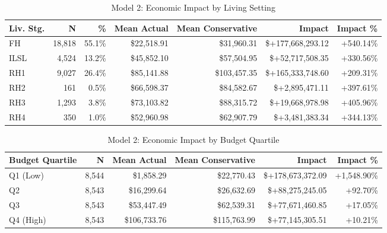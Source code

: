 \begin{table}[htbp]
\centering
\small
\caption{Model 2: Economic Impact by Living Setting}
\label{tab:model2_impact_living}
\begin{tabular}{lrrrrrr}
\toprule
\textbf{Liv. Stg.} & \textbf{N} & \textbf{\%} & \textbf{Mean Actual} & \textbf{Mean Conservative} & \textbf{Impact} & \textbf{Impact \%} \\
\midrule
FH & 18,818 & 55.1\% & \$22,518.91 & \$31,960.31 & \$+177,668,293.12 & +540.14\% \\
ILSL & 4,524 & 13.2\% & \$45,852.10 & \$57,504.95 & \$+52,717,508.35 & +330.56\% \\
RH1 & 9,027 & 26.4\% & \$85,141.88 & \$103,457.35 & \$+165,333,748.60 & +209.31\% \\
RH2 & 161 & 0.5\% & \$66,598.37 & \$84,582.67 & \$+2,895,471.11 & +397.61\% \\
RH3 & 1,293 & 3.8\% & \$73,103.82 & \$88,315.72 & \$+19,668,978.98 & +405.96\% \\
RH4 & 350 & 1.0\% & \$52,960.98 & \$62,907.79 & \$+3,481,383.34 & +344.13\% \\
\bottomrule
\end{tabular}
\end{table}

\begin{table}[htbp]
\centering
\small
\caption{Model 2: Economic Impact by Budget Quartile}
\label{tab:model2_impact_quartile}
\begin{tabular}{lrrrrr}
\toprule
\textbf{Budget Quartile} & \textbf{N} & \textbf{Mean Actual} & \textbf{Mean Conservative} & \textbf{Impact} & \textbf{Impact \%} \\
\midrule
Q1 (Low) & 8,544 & \$1,858.29 & \$22,770.43 & \$+178,673,372.09 & +1,548.90\% \\
Q2 & 8,543 & \$16,299.64 & \$26,632.69 & \$+88,275,245.05 & +92.70\% \\
Q3 & 8,543 & \$53,447.49 & \$62,539.31 & \$+77,671,460.85 & +17.05\% \\
Q4 (High) & 8,543 & \$106,733.76 & \$115,763.99 & \$+77,145,305.51 & +10.21\% \\
\bottomrule
\end{tabular}
\end{table}

